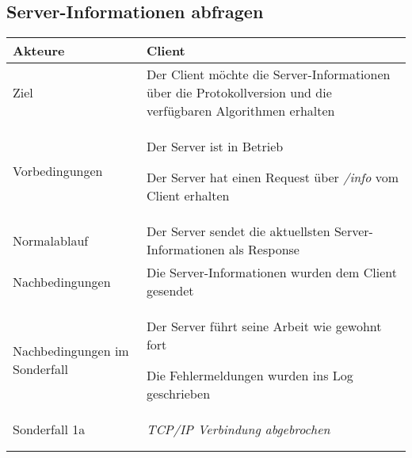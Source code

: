\documentclass[a4paper,10pt,titlepage,parskip=true]{article}
\makeatletter
\newcommand\novspace{\@minipagetrue}
\newenvironment{owncompactitem}{%
\compactitem
}{%
\@finalstrut\@arstrutbox
\@nameuse{endcompactitem}%
\aftergroup\let\aftergroup\@finalstrut\aftergroup\@gobble
}
\newenvironment{owncompactenum}{%
\compactenum
}{%
\@finalstrut\@arstrutbox
\@nameuse{endcompactenum}%
\aftergroup\let\aftergroup\@finalstrut\aftergroup\@gobble
}
\newcommand{\usecase}[7]
{\subsection{#1}
\setlength{\extrarowheight}{2pt}
\begin{tabular}{|p{0.2\textwidth}|p{0.9\textwidth}|}
\hline
  Akteure & #2\\\hline
  Ziel & #3\\\hline
  Vorbedingungen & \novspace
  	\begin{owncompactitem}[-] #4 \end{owncompactitem} \\\hline
  Normalablauf & \vspace{-7pt}
  	\begin{owncompactenum}[1.] #6 \end{owncompactenum} \\\hline
  Nachbedingungen & \novspace
  	\begin{owncompactitem}[-] #5 \end{owncompactitem} \\\hline
  #7
\end{tabular}
}
\newcommand{\sonderfall}[4][\empty]
{
Sonderfall #2 & \vspace{-10pt}
	\textit{#3}
	\begin{owncompactenum}[{#2}.1] {#4} \end{owncompactenum}
  	\ifthenelse{\equal{#1}{\empty}}
    	{\\\hline} %
    	{\ensuremath{\rightarrow} #1 \\ [+1pt] \hline} %

}
\newcommand{\sondernachbedingung}[1]
{
Nachbedingungen im Sonderfall& \novspace
	\begin{owncompactitem}[-]
		#1
	\end{owncompactitem} \\\hline
}
\makeatother
\begin{document}
\usecase{Server-Informationen abfragen}{Client}%
{%
Der Client möchte die Server-Informationen über die Protokollversion und die verfügbaren Algorithmen erhalten
}{%
\item Der Server ist in Betrieb
\item Der Server hat einen Request über \textit{/info} vom Client erhalten
}{%
\item Die Server-Informationen wurden dem Client gesendet
}{%
\item Der Server sendet die aktuellsten Server-Informationen als Response
}{%
\sondernachbedingung{
	\item Der Server führt seine Arbeit wie gewohnt fort
	\item Die Fehlermeldungen wurden ins Log geschrieben}

\sonderfall[Weiter mit normalem Betrieb]{1a}%
	{%
	TCP/IP Verbindung abgebrochen
	}{%
	\item Fehlermeldung „TCP/IP Verbindung abgebrochen“ ins Log schreiben}
}
\end{document}
